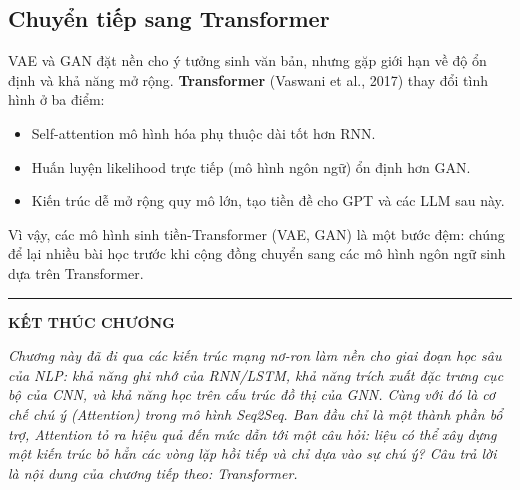 \subsection{Chuyển tiếp sang Transformer}
\label{ssec:transition_to_transformer}

VAE và GAN đặt nền cho ý tưởng sinh văn bản, nhưng gặp giới hạn về độ ổn định và khả năng mở rộng. \textbf{Transformer} (Vaswani et al., 2017) thay đổi tình hình ở ba điểm:
\begin{itemize}
    \item Self-attention mô hình hóa phụ thuộc dài tốt hơn RNN.
    \item Huấn luyện likelihood trực tiếp (mô hình ngôn ngữ) ổn định hơn GAN.
    \item Kiến trúc dễ mở rộng quy mô lớn, tạo tiền đề cho GPT và các LLM sau này.
\end{itemize}

Vì vậy, các mô hình sinh tiền-Transformer (VAE, GAN) là một bước đệm: chúng để lại nhiều bài học trước khi cộng đồng chuyển sang các mô hình ngôn ngữ sinh dựa trên Transformer.

\bigskip
\hrule
\bigskip

\begin{center}
    \textbf{\Large KẾT THÚC CHƯƠNG \thechapter}
\end{center}

\textit{Chương này đã đi qua các kiến trúc mạng nơ-ron làm nền cho giai đoạn học sâu của NLP: khả năng ghi nhớ của RNN/LSTM, khả năng trích xuất đặc trưng cục bộ của CNN, và khả năng học trên cấu trúc đồ thị của GNN. Cùng với đó là cơ chế chú ý (Attention) trong mô hình Seq2Seq. Ban đầu chỉ là một thành phần bổ trợ, Attention tỏ ra hiệu quả đến mức dẫn tới một câu hỏi: liệu có thể xây dựng một kiến trúc bỏ hẳn các vòng lặp hồi tiếp và chỉ dựa vào sự chú ý? Câu trả lời là nội dung của chương tiếp theo: Transformer.}